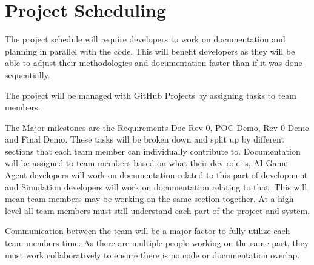 \documentclass{article}
\begin{document}
\section{Project Scheduling}
The project schedule will require developers to work on documentation and planning in parallel with the code. This will benefit developers as they will be able to adjust their 
methodologies and documentation faster than if it was done sequentially.

The project will be managed with GitHub Projects by assigning tasks to team members.

The Major milestones are the Requirements Doc Rev 0, POC Demo, Rev 0 Demo and Final Demo. These tasks will be broken down and split up by different sections that each team member can individually contribute to.
Documentation will be assigned to team members based on what their dev-role is, AI Game Agent developers will work on documentation related to this part of development and
Simulation developers will work on documentation relating to that. This will mean team members may be working on the same section together. At a high level all team members must still understand each part of the project and system.

Communication between the team will be a major factor to fully utilize each team members time. As there are multiple people working on the same part, they must work collaboratively to ensure there is no code or documentation overlap. 
\end{document}
